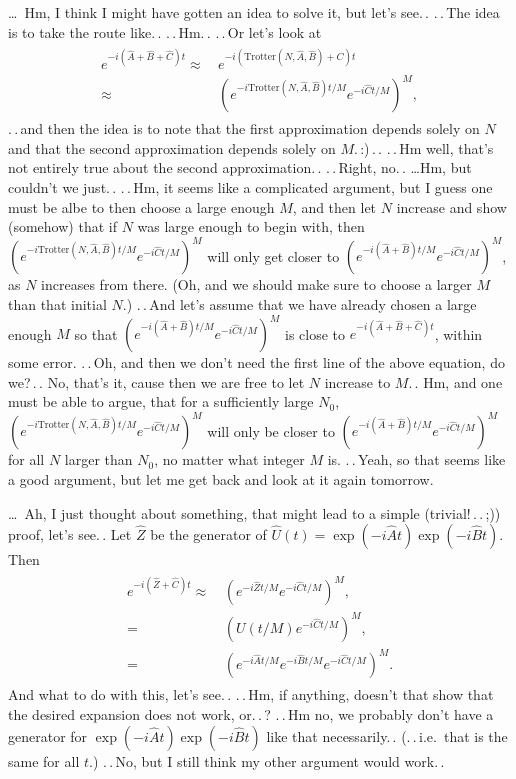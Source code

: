 \documentclass{report}
\begin{document}
\ldots\ Hm, I think I might have gotten an idea to solve it, but let's see.\,. .\,.\,The idea is to take the route like.\,. .\,.\,Hm.\,. .\,.\,Or let's look at
\begin{align}
\begin{aligned}
	e^{-i (\hat A + \hat B + \hat C) t} \approx&\,
		e^{-i (\mathrm{Trotter}(N, \hat A, \hat B) + \hat C) t} 
	\\\approx&\,
		(e^{-i \mathrm{Trotter}(N, \hat A, \hat B) t / M} e^{-i \hat C t / M} )^M,
\end{aligned}
\end{align}
.\,.\,and then the idea is to note that the first approximation depends solely on $N$ and that the second approximation depends solely on $M$.\,:)\,.\,. %
.\,.\,Hm well, that's not entirely true about the second approximation.\,. .\,.\,Right, no.\,. 
\ldots Hm, but couldn't we just.\,. .\,.\,Hm, it seems like a complicated argument, but I guess one must be albe to then choose a large enough $M$, and then let $N$ increase and show (somehow) that if $N$ was large enough to begin with, then $(e^{-i \mathrm{Trotter}(N, \hat A, \hat B) t / M} e^{-i \hat C t / M} )^M$ will only get closer to $(e^{-i (\hat A + \hat B) t / M} e^{-i \hat C t / M} )^M$, as $N$ increases from there. (Oh, and we should make sure to choose a larger $M$ than that initial $N$.) .\,.\,And let's assume that we have already chosen a large enough $M$ so that $(e^{-i (\hat A + \hat B) t / M} e^{-i \hat C t / M} )^M$ is close to $e^{-i (\hat A + \hat B + \hat C) t}$, within some error. .\,.\,Oh, and then we don't need the first line of the above equation, do we?\,.\,. No, that's it, cause then we are free to let $N$ increase to $M$.\,. Hm, and one must be able to argue, that for a sufficiently large $N_0$, $(e^{-i \mathrm{Trotter}(N, \hat A, \hat B) t / M} e^{-i \hat C t / M} )^M$ will only be closer to $(e^{-i (\hat A + \hat B) t / M} e^{-i \hat C t / M} )^M$ for all $N$ larger than $N_0$, no matter what integer $M$ is. .\,.\,Yeah, so that seems like a good argument, but let me get back and look at it again tomorrow. %

\ldots\ Ah, I just thought about something, that might lead to a simple (trivial!\,.\,.\,;)) proof, let's see.\,. Let $\hat Z$ be the generator of $\hat U(t) = \exp(-i \hat A t) \exp(-i \hat B t)$. Then
\begin{align}
\begin{aligned}
	e^{-i (\hat Z + \hat C) t} \approx&\,
		(e^{-i \hat Z t / M} e^{-i \hat C t / M} )^M,
	\\=&\,
		(U(t/M) e^{-i \hat C t / M} )^M,
	\\=&\,
		(e^{-i \hat A t / M} e^{-i \hat B t / M} e^{-i \hat C t / M} )^M.
\end{aligned}
\end{align}
And what to do with this, let's see.\,. .\,.\,Hm, if anything, doesn't that show that the desired expansion does not work, or.\,.\,? .\,.\,Hm no, we probably don't have a generator for $\exp(-i \hat A t) \exp(-i \hat B t)$ like that necessarily.\,. (.\,.\,i.e.\ that is the same for all $t$.) .\,.\,No, but I still think my other argument would work.\,. 
\end{document}

